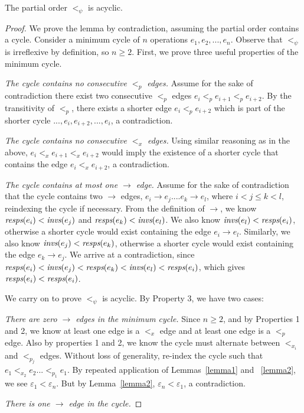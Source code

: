 \begin{lem}
\label{lemmamain}
The partial order $<_\psi$ is acyclic.
\end{lem}
\begin{proof}
We prove the lemma by contradiction, assuming the partial order contains a cycle. Consider a minimum cycle of $n$ operations $e_1,e_2,...,e_n$. Observe that $<_\psi$ is irreflexive by definition, so $n \geq 2$. First, we prove three useful properties of the minimum cycle.

 \textit{The cycle contains no consecutive $<_p$ edges.} {Assume for the sake of contradiction there exist two consecutive $<_p$ edges $e_i <_p e_{i+1} <_p e_{i+2}$. By the transitivity of $<_p$, there exists a shorter edge $e_i <_p e_{i+2}$ which is part of the shorter cycle $..., e_i, e_{i+2}, ..., e_i$, a contradiction.}

 \textit{The cycle contains no consecutive $<_x$ edges.} {Using similar reasoning as in the above, $e_i <_x e_{i+1} <_x e_{i+2}$ would imply the existence of a shorter cycle that contains the edge $e_i <_x e_{i+2}$, a contradiction.}

 \textit{The cycle contains at most one $\rightarrow$ edge.} Assume for the sake of contradiction that the cycle contains two $\rightarrow$ edges, $e_i \rightarrow e_j .... e_k \rightarrow e_l$, where $i < j \leq k < l$, reindexing the cycle if necessary. From the definition of $\rightarrow$, we know $\operatorname*{\textit{resps}}(e_i) < \operatorname*{\textit{invs}}(e_j)$ and $\operatorname*{\textit{resps}}(e_k) < \operatorname*{\textit{invs}}(e_l)$. We also know $\operatorname*{\textit{invs}}(e_l) < \operatorname*{\textit{resps}}(e_i)$, otherwise a shorter cycle would exist containing the edge $e_i \rightarrow e_l$. Similarly, we also know $\operatorname*{\textit{invs}}(e_j) < \operatorname*{\textit{resps}}(e_k)$, otherwise a shorter cycle would exist containing the edge $e_k \rightarrow e_j$. We arrive at a contradiction, since $\operatorname*{\textit{resps}}(e_i) < \operatorname*{\textit{invs}}(e_j) < \operatorname*{\textit{resps}}(e_k) < \operatorname*{\textit{invs}}(e_l) < \operatorname*{\textit{resps}}(e_i)$, which gives $\operatorname*{\textit{resps}}(e_i) < \operatorname*{\textit{resps}}(e_i)$.

We carry on to prove $<_\psi$ is acyclic. By Property 3, we have two cases:

 \textit{There are zero $\rightarrow$ edges in the minimum cycle.} Since $n \geq 2$, and by Properties 1 and 2, we know at least one edge is a $<_x$ edge and at least one edge is a $<_p$ edge. Also by properties 1 and 2, we know the cycle must alternate between $<_{x_i}$ and $<_{p_j}$ edges. Without loss of generality, re-index the cycle such that $e_1 <_{x_2} e_2 ... <_{p_1} e_1$.
By repeated application of Lemmas~\ref{lemma1} and ~\ref{lemma2}, we see $\varepsilon_1 < \varepsilon_n$. But by Lemma~\ref{lemma2}, $\varepsilon_n < \varepsilon_1$, a contradiction.

 \textit{There is one $\rightarrow$ edge in the cycle.}

\end{proof}